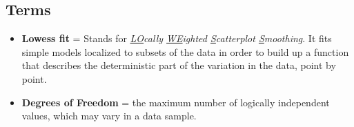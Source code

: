 \subsection{Terms}

\begin{itemize}
    \item \textbf{Lowess fit} = Stands for \textit{\underline{LO}cally \underline{WE}ighted \underline{S}catterplot \underline{S}moothing}.
    It fits simple models localized to subsets of the data in order to build up a function that describes the deterministic part of the variation in the data, point by point.
    \item \textbf{Degrees of Freedom} = the maximum number of logically independent values, which may vary in a data sample. 
\end{itemize} 